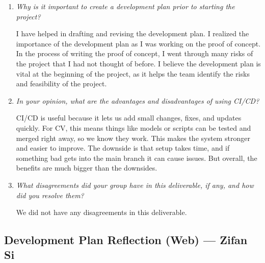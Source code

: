 \documentclass{article}
\begin{document}
\begin{enumerate}
  \item \textit{Why is it important to create a development plan prior to starting the project?}

        I have helped in drafting and revising the development plan. I realized the
        importance of the development plan as I was working on the proof of concept. In
        the process of writing the proof of concept, I went through many risks of the
        project that I had not thought of before. I believe the development plan is
        vital at the beginning of the project, as it helps the team identify the risks
        and feasibility of the project.

  \item \textit{In your opinion, what are the advantages and disadvantages of using CI/CD?}

        CI/CD is useful because it lets us add small changes, fixes, and updates
        quickly. For CV, this means things like models or scripts can be tested and
        merged right away, so we know they work. This makes the system stronger and
        easier to improve. The downside is that setup takes time, and if something bad
        gets into the main branch it can cause issues. But overall, the benefits are
        much bigger than the downsides.

  \item \textit{What disagreements did your group have in this deliverable, if any, and how did you resolve them?}

        We did not have any disagreements in this deliverable.

\end{enumerate}

\subsection*{Development Plan Reflection (Web) --- Zifan Si}
\end{document}
